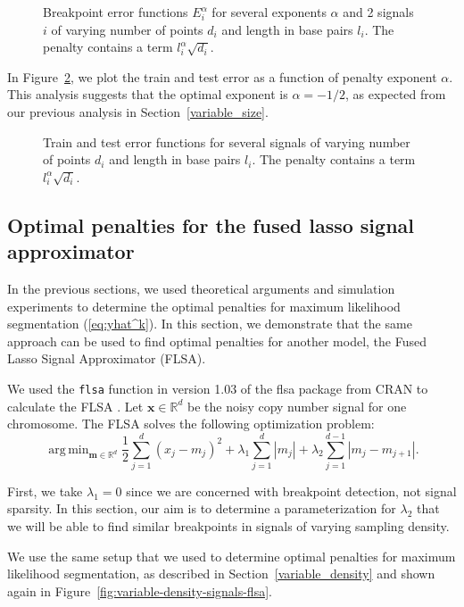 \documentclass{jsfds} %
\newcommand{\fig}[3][H]{
  \begin{figure}[#1]
    \hskip -1cm
    
    \caption{#3}
    \label{fig:#2}
  \end{figure}
}
\DeclareMathOperator*{\argmin}{arg\,min}
\newcommand{\RR}{\mathbb{R}}
\begin{document}
\fig{variable-size-berr}{Breakpoint error functions $E_i^\alpha$ for
  several exponents $\alpha$ and 2 signals $i$ of varying number of
  points $d_i$ and length in base pairs $l_i$. The penalty contains a
  term $l_i^\alpha\sqrt{d_i}$.}

In Figure~\ref{fig:variable-size-error-alpha}, we plot the train and
test error as a function of penalty exponent $\alpha$. This analysis
suggests that the optimal exponent is $\alpha=-1/2$, as expected from
our previous analysis in Section~\ref{variable_size}.

\fig{variable-size-error-alpha}{Train and test error functions for
  several signals of varying number of points $d_i$ and length in base
  pairs $l_i$. The penalty contains a term $l_i^\alpha \sqrt{d_i}$.}

\newpage
\subsection{Optimal penalties for the fused lasso signal approximator}

In the previous sections, we used theoretical arguments and simulation
experiments to determine the optimal penalties for maximum likelihood
segmentation (\ref{eq:yhat^k}). In this section, we demonstrate that
the same approach can be used to find optimal penalties for another
model, the Fused Lasso Signal Approximator (FLSA).

We used the \verb|flsa| function in version 1.03 of the flsa
package from CRAN to calculate the FLSA \citep{fused-lasso-path}. Let
$\mathbf x\in\RR^d$ be the noisy copy number signal for one chromosome. The
FLSA solves the following optimization problem:
\begin{equation}
  \label{eq:flsa}
\argmin_{\mathbf m\in\RR^d} 
\frac 1 2 \sum_{j=1}^d (x_j-m_j)^2
+\lambda_1\sum_{j=1}^d|m_j|
+\lambda_2\sum_{j=1}^{d-1}|m_j-m_{j+1}|.
\end{equation}

First, we take $\lambda_1=0$ since we are concerned with breakpoint
detection, not signal sparsity. In this section, our aim is to
determine a parameterization for $\lambda_2$ that we will be able to
find similar breakpoints in signals of varying sampling density.

We use the same setup that we used to determine optimal penalties for
maximum likelihood segmentation, as described in
Section~\ref{variable_density} and shown again in
Figure~\ref{fig:variable-density-signals-flsa}.
\end{document}
